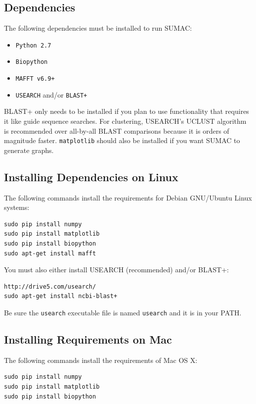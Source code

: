 \documentclass[10pt]{report}
\begin{document}
\subsection{Dependencies}

The following dependencies must be installed to run SUMAC:

\begin{itemize}
\item \texttt{Python 2.7}
\item \texttt{Biopython}
\item \texttt{MAFFT v6.9+}
\item \texttt{USEARCH} and/or \texttt{BLAST+}
\end{itemize}

BLAST+ only needs to be installed if you plan to use functionality that requires it 
like guide sequence searches.
For clustering, USEARCH's UCLUST algorithm is recommended over all-by-all BLAST
comparisons because it is orders of magnitude faster.
\texttt{matplotlib} should also be installed if you want SUMAC to generate graphs.


\subsection{Installing Dependencies on Linux}

The following commands install the requirements for Debian GNU/Ubuntu Linux systems:

\begin{verbatim}
sudo pip install numpy
sudo pip install matplotlib
sudo pip install biopython
sudo apt-get install mafft
\end{verbatim}
You must also either install USEARCH (recommended) and/or BLAST+:
\begin{verbatim}
http://drive5.com/usearch/
sudo apt-get install ncbi-blast+
\end{verbatim}
Be sure the \texttt{usearch} executable file is named
\texttt{usearch} and it is in your PATH.

\subsection{Installing Requirements on Mac}

The following commands install the requirements of Mac OS X:

\begin{verbatim}
sudo pip install numpy
sudo pip install matplotlib
sudo pip install biopython
\end{verbatim}
\end{document}

